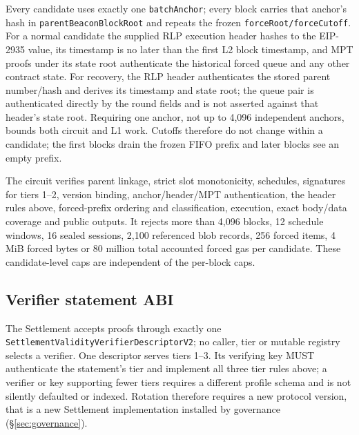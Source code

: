 \documentclass[a4paper,11pt]{article}
\newcommand{\code}[1]{\nolinkurl{#1}}
\begin{document}
Every candidate uses exactly one \code{batchAnchor}; every block carries that
anchor's hash in \code{parentBeaconBlockRoot} and repeats the frozen
\code{forceRoot/forceCutoff}.  For a normal candidate the
supplied RLP
execution header hashes to the EIP-2935 value, its timestamp is no later than
the first L2 block timestamp, and MPT proofs under its state root authenticate
the historical forced queue and any other contract state.  For recovery, the
RLP header authenticates the stored parent number/hash and derives its timestamp
and state root; the queue pair
is authenticated directly by the round fields and is not asserted against that
header's state root.  Requiring one
anchor, not up to 4,096 independent anchors, bounds both circuit and L1 work.
Cutoffs therefore do not change within a candidate; the first blocks drain the
frozen FIFO prefix and later blocks see an empty prefix.

The circuit verifies parent linkage, strict slot monotonicity, schedules,
signatures for tiers 1--2, version binding, anchor/header/MPT authentication,
the header rules above, forced-prefix ordering and classification, execution,
exact body/data coverage and public outputs.
It rejects more than 4,096 blocks, 12 schedule windows, 16 sealed sessions,
2,100 referenced blob records, 256 forced items, 4 MiB forced bytes or 80
million total accounted forced gas per candidate.  These candidate-level caps
are independent of the per-block caps.

\subsection{Verifier statement ABI}

The Settlement accepts proofs through exactly one
\code{SettlementValidityVerifierDescriptorV2}; no caller, tier or
mutable registry selects a verifier.  One descriptor serves tiers 1--3.  Its
verifying key MUST authenticate the statement's tier and implement all three
tier rules above; a verifier or key supporting fewer tiers requires a different
profile schema and is not silently defaulted or indexed.  Rotation therefore
requires a new protocol version, that is a new Settlement implementation
installed by governance (\S\ref{sec:governance}).
\end{document}
